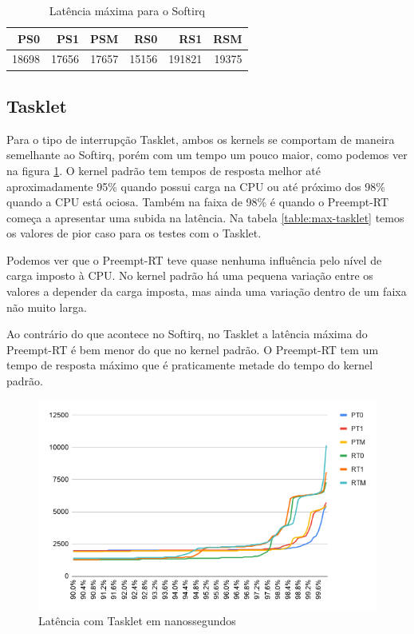 \begin{table}[!htb]
    \centering
    \begin{center}
        \begin{tabular}{|r|r|r|r|r|r|}
            \toprule
                PS0 &    PS1 &    PSM &    RS0 &     RS1 &    RSM \\
            \midrule
                18698 &	17656 &	17657 & 15156 & 191821 &	19375 \\
            \bottomrule
        \end{tabular}
    \end{center}
    \caption{Latência máxima para o Softirq}
    \label{table:max-softirq}
\end{table}


\subsection{Tasklet}

Para o tipo de interrupção Tasklet, ambos os kernels se comportam de maneira semelhante ao Softirq, porém com um tempo um pouco maior, como podemos ver na figura \ref{grafico:tasklet}. O kernel padrão tem tempos de resposta melhor até aproximadamente 95\% quando possui carga na CPU ou até próximo dos 98\% quando a CPU está ociosa. Também na faixa de 98\% é quando o Preempt-RT começa a apresentar uma subida na latência. Na tabela \ref{table:max-tasklet} temos os valores de pior caso para os testes com o Tasklet.

Podemos ver que o Preempt-RT teve quase nenhuma influência pelo nível de carga imposto à CPU. No kernel padrão há uma pequena variação entre os valores a depender da carga imposta, mas ainda uma variação dentro de um faixa não muito larga.

Ao contrário do que acontece no Softirq, no Tasklet a latência máxima do Preempt-RT é bem menor do que no kernel padrão. O Preempt-RT tem um tempo de resposta máximo que é praticamente metade do tempo do kernel padrão.

\begin{figure}[!htb]
    \centering
    \includegraphics[width=1.0\textwidth]{graficos/tasklet.png}
    \caption{Latência com Tasklet em nanossegundos}
    \label{grafico:tasklet}
\end{figure}


